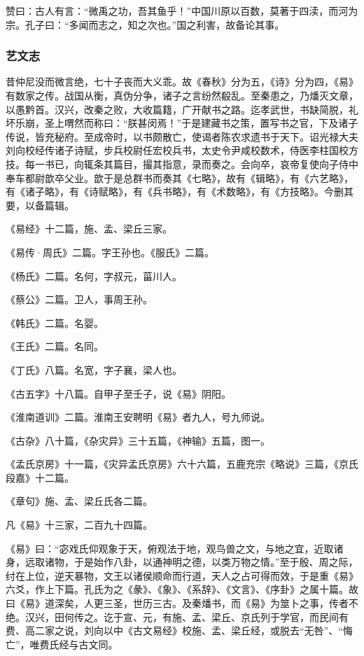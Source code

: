 \documentclass[]{article}
\begin{document}
赞曰：古人有言：``微禹之功，吾其鱼乎！''中国川原以百数，莫著于四渎，而河为宗。孔子曰：``多闻而志之，知之次也。''国之利害，故备论其事。

\hypertarget{header-n2754}{%
\subsubsection{艺文志}\label{header-n2754}}

昔仲尼没而微言绝，七十子丧而大义乖。故《春秋》分为五，《诗》分为四，《易》有数家之传。战国从衡，真伪分争，诸子之言纷然殽乱。至秦患之，乃燔灭文章，以愚黔首。汉兴，改秦之败，大收篇籍，广开献书之路。迄孝武世，书缺简脱，礼坏乐崩，圣上喟然而称曰：``朕甚闵焉！''于是建藏书之策，置写书之官，下及诸子传说，皆充秘府。至成帝时，以书颇散亡，使谒者陈农求遗书于天下。诏光禄大夫刘向校经传诸子诗赋，步兵校尉任宏校兵书，太史令尹咸校数术，侍医李柱国校方技。每一书已，向辄条其篇目，撮其指意，录而奏之。会向卒，哀帝复使向子侍中奉车都尉歆卒父业。歆于是总群书而奏其《七略》，故有《辑略》，有《六艺略》，有《诸子略》，有《诗赋略》，有《兵书略》，有《术数略》，有《方技略》。今删其要，以备篇辑。

《易经》十二篇，施、孟、梁丘三家。

《易传·周氏》二篇。字王孙也。《服氏》二篇。

《杨氏》二篇。名何，字叔元，菑川人。

《蔡公》二篇。卫人，事周王孙。

《韩氏》二篇。名婴。

《王氏》二篇。名同。

《丁氏》八篇。名宽，字子襄，梁人也。

《古五字》十八篇。自甲子至壬子，说《易》阴阳。

《淮南道训》二篇。淮南王安聘明《易》者九人，号九师说。

《古杂》八十篇，《杂灾异》三十五篇，《神输》五篇，图一。

《孟氏京房》十一篇，《灾异孟氏京房》六十六篇，五鹿充宗《略说》三篇，《京氏段嘉》十二篇。

《章句》施、孟、梁丘氏各二篇。

凡《易》十三家，二百九十四篇。

《易》曰：``宓戏氏仰观象于天，俯观法于地，观鸟兽之文，与地之宜，近取诸身，远取诸物，于是始作八卦，以通神明之德，以类万物之情。''至于殷、周之际，纣在上位，逆天暴物，文王以诸侯顺命而行道，天人之占可得而效，于是重《易》六爻，作上下篇。孔氏为之《彖》、《象》、《系辞》、《文言》、《序卦》之属十篇。故曰《易》道深矣，人更三圣，世历三古。及秦燔书，而《易》为筮卜之事，传者不绝。汉兴，田何传之。讫于宣、元，有施、孟、梁丘、京氏列于学官，而民间有费、高二家之说，刘向以中《古文易经》校施、孟、梁丘经，或脱去``无咎''、``悔亡''，唯费氏经与古文同。
\end{document}
